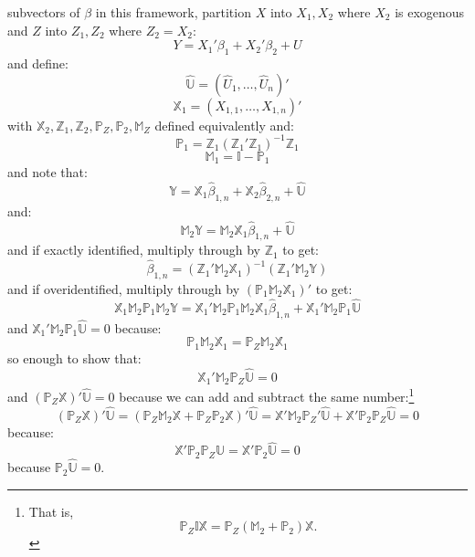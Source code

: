 \documentclass{tufte-book}
\theoremstyle{mytheoremstyle}
\theoremstyle{mylemstyle}
\theoremstyle{mydefstyle}
\begin{document}
 subvectors of \(\beta\) in this framework, partition \(X\) into \(X_1, X_2\) where \(X_2\) is exogenous and \(Z\) into \(Z_1, Z_2\) where \(Z_2 = X_2\):
	\[Y = X_1'\beta_1 + X_2'\beta_2 + U\]
and define:
	\[\hat{\mathbb{U}} = (\hat{U}_1, \dots, \hat{U}_n)'\]
	\[\mathbb{X}_1 = (X_{1,1}, \dots, X_{1,n})'\]
with \(\mathbb{X}_2, \mathbb{Z}_1, \mathbb{Z}_2, \mathbb{P}_Z, \mathbb{P}_2, \mathbb{M}_Z\) defined equivalently and:
	\[\mathbb{P}_1 = \mathbb{Z}_1(\mathbb{Z}_1'\mathbb{Z}_1)^{-1}\mathbb{Z}_1\]
	\[\mathbb{M}_1 = \mathbb{I} - \mathbb{P}_1\]
and note that:
	\[\mathbb{Y} = \mathbb{X}_1\hat{\beta}_{1,n} + \mathbb{X}_2 \hat{\beta}_{2,n} + \hat{\mathbb{U}}\]
and:
	\[\mathbb{M}_2 \mathbb{Y} = \mathbb{M}_2\mathbb{X}_1 \hat{\beta}_{1,n} + \hat{\mathbb{U}}\]
and if exactly identified, multiply through by \(\mathbb{Z}_1\) to get:
	\[\hat{\beta}_{1,n} = (\mathbb{Z}_1'\mathbb{M}_2\mathbb{X}_1)^{-1}(\mathbb{Z}_1'\mathbb{M}_2 \mathbb{Y})\]
and if overidentified, multiply through by \((\mathbb{P}_1\mathbb{M}_2 \mathbb{X}_1)'\) to get:
	\[\mathbb{X}_1\mathbb{M}_2 \mathbb{P}_1 \mathbb{M}_2 \mathbb{Y} = \mathbb{X}_1'\mathbb{M}_2 \mathbb{P}_1 \mathbb{M}_2\mathbb{X}_1\hat{\beta}_{1,n} + \mathbb{X}_1'\mathbb{M}_2 \mathbb{P}_1 \hat{\mathbb{U}}\]
and \(\mathbb{X}_1'\mathbb{M}_2 \mathbb{P}_1 \hat{\mathbb{U}} = 0\) because:
	\[\mathbb{P}_1\mathbb{M}_2 \mathbb{X}_1 = \mathbb{P}_Z \mathbb{M}_2 \mathbb{X}_1\]
so enough to show that:
	\[\mathbb{X}_1'\mathbb{M}_2\mathbb{P}_Z\hat{\mathbb{U}} = 0\]
and \((\mathbb{P}_Z\mathbb{X})'\hat{\mathbb{U}} = 0\) because we can add and subtract the same number:\footnote{That is, \[\mathbb{P}_Z \mathbb{I}\mathbb{X} = \mathbb{P}_Z(\mathbb{M}_2 + \mathbb{P}_2)\mathbb{X}\text{.}\]}
	\[(\mathbb{P}_Z\mathbb{X})'\hat{\mathbb{U}} = (\mathbb{P}_Z \mathbb{M}_2 \mathbb{X} + \mathbb{P}_Z \mathbb{P}_2 \mathbb{X})'\hat{\mathbb{U}} = \mathbb{X}'\mathbb{M}_2\mathbb{P}_Z'\hat{\mathbb{U}} + \mathbb{X}'\mathbb{P}_2\mathbb{P}_Z\hat{\mathbb{U}} = 0\]
because:
	\[\mathbb{X}'\mathbb{P}_2 \mathbb{P}_Z \hat{\mathbb{U}} = \mathbb{X}'\mathbb{P}_2\hat{\mathbb{U}} = 0\]
because \(\mathbb{P}_2 \hat{\mathbb{U}} = 0\). 
\end{document}
